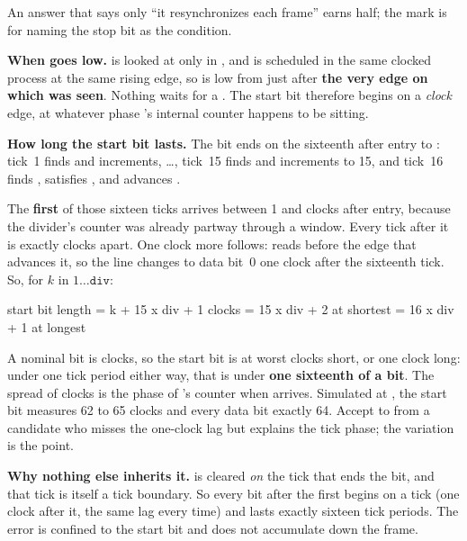 An answer that says only ``it resynchronizes each frame'' earns half; the mark is for naming the
stop bit as the condition.

\textbf{When  goes low.}  is looked at only in , and
 is scheduled in the same clocked process at the same rising edge, so  is
low from just after \textbf{the very edge on which  was seen}. Nothing waits for a
. The start bit therefore begins on a \emph{clock} edge, at whatever phase
's internal counter happens to be sitting. 

\textbf{How long the start bit lasts.} The bit ends on the sixteenth  after entry to
: tick~1 finds  and increments, \dots, tick~15 finds
 and increments to 15, and tick~16 finds , satisfies
, and advances .

The \textbf{first} of those sixteen ticks arrives between 1 and  clocks after entry,
because the divider's counter was already partway through a window. Every tick after it is exactly
 clocks apart. One clock more follows:  reads 
before the edge that advances it, so the line changes to data bit~0 one clock after the sixteenth
tick. So, for $k$ in $1 \ldots \mathtt{div}$:

\begin{console}
start bit length = k + 15 x div + 1  clocks
                 = 15 x div + 2       at shortest
                 = 16 x div + 1       at longest
\end{console}

A nominal bit is  clocks, so the start bit is at worst  clocks short,
or one clock long: under one tick period either way, that is under \textbf{one sixteenth of a bit}.
The spread of  clocks is the phase of 's counter when 
arrives. Simulated at , the start bit measures 62 to 65 clocks and every data bit
exactly 64. Accept  to  from a candidate who misses the one-clock
lag but explains the tick phase; the variation is the point.

\textbf{Why nothing else inherits it.}  is cleared \emph{on} the tick that ends the bit,
and that tick is itself a tick boundary. So every bit after the first begins on a tick (one clock
after it, the same lag every time) and lasts exactly sixteen tick periods. The error is confined to
the start bit and does not accumulate down the frame.

